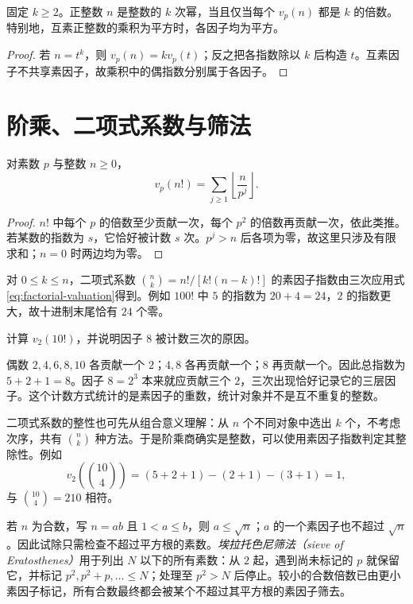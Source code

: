 \begin{corollary}
固定 $k\ge2$。正整数 $n$ 是整数的 $k$ 次幂，当且仅当每个 $v_p(n)$ 都是 $k$ 的倍数。特别地，互素正整数的乘积为平方时，各因子均为平方。
\end{corollary}
\begin{proof}
若 $n=t^k$，则 $v_p(n)=kv_p(t)$；反之把各指数除以 $k$ 后构造 $t$。互素因子不共享素因子，故乘积中的偶指数分别属于各因子。
\end{proof}

\section{阶乘、二项式系数与筛法}

\begin{proposition}[阶乘中的素因子指数]
对素数 $p$ 与整数 $n\ge0$，
\begin{equation}
 v_p(n!)=\sum_{j\ge1}\left\lfloor\frac{n}{p^j}\right\rfloor.
 \label{eq:factorial-valuation}
\end{equation}
\end{proposition}
\begin{proof}
$n!$ 中每个 $p$ 的倍数至少贡献一次，每个 $p^2$ 的倍数再贡献一次，依此类推。若某数的指数为 $s$，它恰好被计数 $s$ 次。$p^j>n$ 后各项为零，故这里只涉及有限求和；$n=0$ 时两边均为零。
\end{proof}

对 $0\le k\le n$，二项式系数 $\binom nk=n!/[k!(n-k)!]$ 的素因子指数由三次应用式\eqref{eq:factorial-valuation}得到。例如 $100!$ 中 $5$ 的指数为 $20+4=24$，$2$ 的指数更大，故十进制末尾恰有 $24$ 个零。

\begin{example}[分层计数为何不会重复多算]
计算 $v_2(10!)$，并说明因子 $8$ 被计数三次的原因。
\end{example}
\begin{solve}
偶数 $2,4,6,8,10$ 各贡献一个 $2$；$4,8$ 各再贡献一个；$8$ 再贡献一个。因此总指数为 $5+2+1=8$。因子 $8=2^3$ 本来就应贡献三个 $2$，三次出现恰好记录它的三层因子。这个计数方式统计的是素因子的重数，统计对象并不是互不重复的整数。
\end{solve}

二项式系数的整性也可先从组合意义理解：从 $n$ 个不同对象中选出 $k$ 个，不考虑次序，共有 $\binom nk$ 种方法。于是阶乘商确实是整数，可以使用素因子指数判定其整除性。例如
\[
 v_2\!\left(\binom{10}{4}\right)
 =(5+2+1)-(2+1)-(3+1)=1,
\]
与 $\binom{10}{4}=210$ 相符。

若 $n$ 为合数，写 $n=ab$ 且 $1<a\le b$，则 $a\le\sqrt n$；$a$ 的一个素因子也不超过 $\sqrt n$。因此试除只需检查不超过平方根的素数。\emph{埃拉托色尼筛法（sieve of Eratosthenes）}用于列出 $N$ 以下的所有素数：从 $2$ 起，遇到尚未标记的 $p$ 就保留它，并标记 $p^2,p^2+p,\ldots\le N$；处理至 $p^2>N$ 后停止。较小的合数倍数已由更小素因子标记，所有合数最终都会被某个不超过其平方根的素因子筛去。

